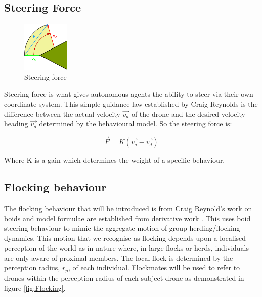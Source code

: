 \subsection{Steering Force}

\begin{figure}
    \begin{center}
    \includegraphics[width=0.2\textwidth]{figures/PropNav.png}
    \end{center}
    \caption{Steering force}
    \label{fig:PropNAv}
\end{figure}

Steering force is what gives autonomous agents the ability to steer via their own coordinate system. This simple guidance law established by Craig Reynolds \cite{boid4} is the difference between the actual velocity \(\vec{v_a}\) of the drone and the desired velocity heading \(\vec{v_d}\) determined by the behavioural model. So the steering force is:

\begin{equation}
    \vec{F} = K(\vec{v_a} - \vec{v_d})
\end{equation}

Where K is a gain which determines the weight of a specific behaviour.

\subsection{Flocking behaviour} \label{flock}
The flocking behaviour that will be introduced is from Craig Reynold's work on boids \cite{boid1} and model formulae are established from derivative work  \cite{boid3}. This uses boid steering behaviour to mimic the aggregate motion of group herding/flocking dynamics. This motion that we recognise as flocking depends upon a localised perception of the world as in nature where, in large flocks or herds, individuals are only aware of proximal members.
The local flock is determined by the perception radius, $r_p$, of each individual. Flockmates will be used to refer to  drones within the perception radius of each subject drone as demonstrated in figure \ref{fig:Flocking}. 

